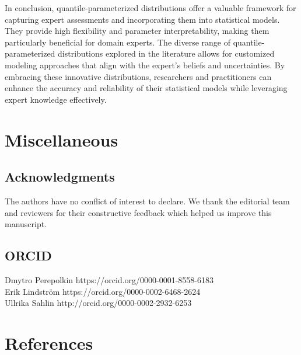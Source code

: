 \documentclass[
  fleqn,
  deca,
  blindrev
]{informs4}
\begin{document}
In conclusion, quantile-parameterized distributions offer a valuable
framework for capturing expert assessments and incorporating them into
statistical models. They provide high flexibility and parameter
interpretability, making them particularly beneficial for domain
experts. The diverse range of quantile-parameterized distributions
explored in the literature allows for customized modeling approaches
that align with the expert's beliefs and uncertainties. By embracing
these innovative distributions, researchers and practitioners can
enhance the accuracy and reliability of their statistical models while
leveraging expert knowledge effectively.

\section*{Miscellaneous}\label{miscellaneous}

\subsection*{Acknowledgments}\label{acknowledgments}

The authors have no conflict of interest to declare. We thank the
editorial team and reviewers for their constructive feedback which
helped us improve this manuscript.

\subsection*{ORCID}\label{orcid}

Dmytro Perepolkin https://orcid.org/0000-0001-8558-6183\\
Erik Lindström https://orcid.org/0000-0002-6468-2624\\
Ullrika Sahlin http://orcid.org/0000-0002-2932-6253

\section*{References}\label{references}

\renewcommand{\bibsection}{}

\end{document}
